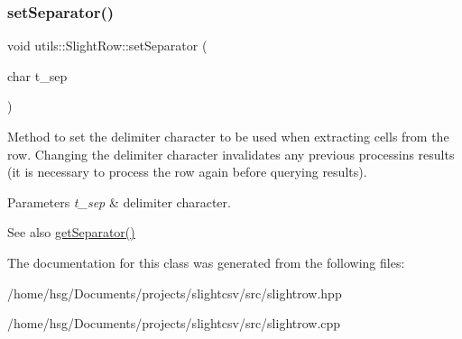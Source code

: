 \subsubsection{\texorpdfstring{set\+Separator()}{setSeparator()}}
{\footnotesize\ttfamily void utils\+::\+Slight\+Row\+::set\+Separator (\begin{DoxyParamCaption}\item[{char}]{t\+\_\+sep }\end{DoxyParamCaption})}

Method to set the delimiter character to be used when extracting cells from the row. Changing the delimiter character invalidates any previous processins results (it is necessary to process the row again before querying results). 
\begin{DoxyParams}{Parameters}
{\em t\+\_\+sep} & delimiter character. \\
\hline
\end{DoxyParams}
\begin{DoxySeeAlso}{See also}
\hyperlink{classutils_1_1SlightRow_a1095fd58142659bd85871622ab3d9b1c}{get\+Separator()} 
\end{DoxySeeAlso}


The documentation for this class was generated from the following files\+:\begin{DoxyCompactItemize}
\item 
/home/hsg/\+Documents/projects/slightcsv/src/slightrow.\+hpp\item 
/home/hsg/\+Documents/projects/slightcsv/src/slightrow.\+cpp\end{DoxyCompactItemize}
